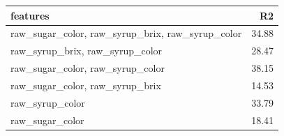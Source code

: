 \begin{longtable}{lr}
\hline
 features                                               &    R2 \\
\hline
 raw\_sugar\_color, raw\_syrup\_brix, raw\_syrup\_color & 34.88 \\
 raw\_syrup\_brix, raw\_syrup\_color                    & 28.47 \\
 raw\_sugar\_color, raw\_syrup\_color                   & 38.15 \\
 raw\_sugar\_color, raw\_syrup\_brix                    & 14.53 \\
 raw\_syrup\_color                                      & 33.79 \\
 raw\_sugar\_color                                      & 18.41 \\
\hline
\end{longtable}
